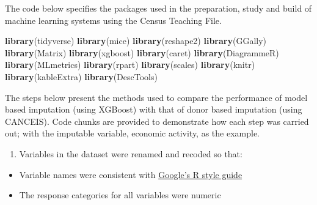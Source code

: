 \documentclass[]{book}
\newenvironment{Shaded}{\begin{snugshade}}{\end{snugshade}}
\newcommand{\KeywordTok}[1]{\textcolor[rgb]{0.13,0.29,0.53}{\textbf{#1}}}
\newcommand{\NormalTok}[1]{#1}
\providecommand{\tightlist}{%
  \setlength{\itemsep}{0pt}\setlength{\parskip}{0pt}}
\begin{document}
The code below specifies the packages used in the preparation, study and
build of machine learning systems using the Census Teaching File.

\begin{Shaded}
\begin{Highlighting}[]
\KeywordTok{library}\NormalTok{(tidyverse)}
\KeywordTok{library}\NormalTok{(mice)}
\KeywordTok{library}\NormalTok{(reshape2)}
\KeywordTok{library}\NormalTok{(GGally)}
\KeywordTok{library}\NormalTok{(Matrix)}
\KeywordTok{library}\NormalTok{(xgboost)}
\KeywordTok{library}\NormalTok{(caret)}
\KeywordTok{library}\NormalTok{(DiagrammeR)}
\KeywordTok{library}\NormalTok{(MLmetrics)}
\KeywordTok{library}\NormalTok{(rpart)}
\KeywordTok{library}\NormalTok{(scales)}
\KeywordTok{library}\NormalTok{(knitr)}
\KeywordTok{library}\NormalTok{(kableExtra)}
\KeywordTok{library}\NormalTok{(DescTools)}
\end{Highlighting}
\end{Shaded}

The steps below present the methods used to compare the performance of
model based imputation (using XGBoost) with that of donor based
imputation (using CANCEIS). Code chunks are provided to demonstrate how
each step was carried out; with the imputable variable, economic
activity, as the example.

\begin{enumerate}
\def\labelenumi{\arabic{enumi})}
\tightlist
\item
  Variables in the dataset were renamed and recoded so that:
\end{enumerate}

\begin{itemize}
\tightlist
\item
  Variable names were consistent with
  \href{https://google.github.io/styleguide/Rguide.xml}{Google's R style
  guide}
\item
  The response categories for all variables were numeric
\end{itemize}
\end{document}
